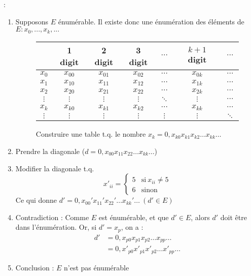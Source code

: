  :
\begin{enumerate}
\item Supposons $E$ énumérable. Il existe donc une énumération des éléments de $E : x_0, ..., x_k, ...$
\begin{figure}[H]
    	\centering
    	\begin{tabular}{c|cccccc}
	 & 1 digit & 2 digit & 3 digit & $\cdots$ & $k+1$ digit & $\cdots$ \\ 
	\hline 
	$x_0$ & $x_{00}$ & $x_{01}$ & $x_{02}$ & $\cdots$ & $x_{0k}$ & $\cdots$ \\ 
	$x_1$ & $x_{10}$ & $x_{11}$ & $x_{12}$ & $\cdots$ & $x_{1k}$ & $\cdots$ \\ 
	$x_2$ & $x_{20}$ & $x_{21}$ & $x_{22}$ & $\cdots$ & $x_{2k}$ & $\cdots$ \\ 
	$\vdots$ & $\vdots$ & $\vdots$ & $\vdots$ & $\ddots$ & $\vdots$ & $\cdots$ \\ 
	$x_k$ & $x_{k0}$ & $x_{k1}$ & $x_{k2}$ & $\cdots$ & $x_{kk}$ & $\cdots$ \\ 
	$\vdots$ & $\vdots$ & $\vdots$ & $\vdots$ & $\vdots$ & $\vdots$ & $\ddots$ \\ 
	\end{tabular}
	\caption{Construire une table t.q. le nombre $x_k = 0,x_{k0} x_{k1} x_{k2} \ldots x_{kk} \ldots$}
\end{figure}
\item Prendre la diagonale ($d = 0,x_{00} x_{11} x_{22} \ldots x_{kk} \ldots$)
\item Modifier la diagonale t.q.
\begin{equation*}
	x'_{ii}=
	\begin{cases}
      	5 & \text{si}\ x_{ii} \neq 5 \\
      	6 & \text{sinon}
    \end{cases}
\end{equation*}
Ce qui donne $d' =  0,x_{00}' x_{11}' x_{22}' \ldots x_{kk}' \ldots \ (d' \in E)$
\item Contradiction : Comme $E$ est énumérable, et que $d' \in E$, alors $d'$ doit être dans l'énumération. Or, si $d' = x_p$, on a :
\begin{align*}
	d' &= 0,x_{p0} x_{p1} x_{p2} \ldots x_{pp} \ldots\\
	   &= 0,x'_{p0} x'_{p1} x'_{p2} \ldots x'_{pp} \ldots
\end{align*}
\item Conclusion : $E$ n'est pas énumérable
\end{enumerate}

